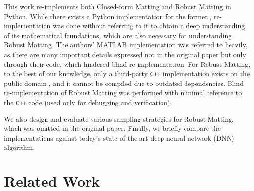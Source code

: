 \documentclass{article}
\theoremstyle{definition}
\begin{document}
\begin{multicols}{2}[]
This work re-implements both Closed-form Matting \cite{closed-form-matting} and Robust Matting \cite{robust-matting} in Python. While there exists a Python implementation for the former \cite{web:closed-form-python-github}, re-implementation was done without referring to it to obtain a deep understanding of its mathematical foundations, which are also necessary for understanding Robust Matting. The authors' MATLAB implementation was referred to heavily, as there are many important details expressed not in the original paper but only through their code, which hindered blind re-implementation. For Robust Matting, to the best of our knowledge, only a third-party \verb|C++| implementation exists on the public domain \cite{web:robust-cpp-github}, and it cannot be compiled due to outdated dependencies. Blind re-implementation of Robust Matting was performed with minimal reference to the \verb|C++| code (used only for debugging and verification).

We also design and evaluate various sampling strategies for Robust Matting, which was omitted in the original paper. Finally, we briefly compare the implementations against today's state-of-the-art deep neural network (DNN) algorithm.





\section{Related Work}


\end{multicols}
\end{document}
